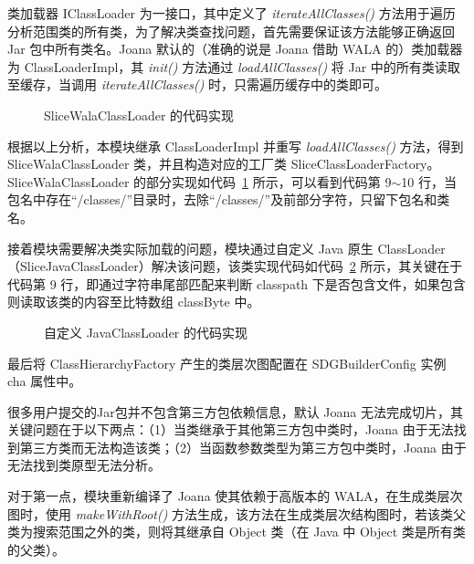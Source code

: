 类加载器 IClassLoader 为一接口，其中定义了 \textit{iterateAllClasses()} 方法用于遍历分析范围类的所有类，为了解决类查找问题，首先需要保证该方法能够正确返回 Jar 包中所有类名。Joana 默认的（准确的说是 Joana 借助 WALA 的）类加载器为 ClassLoaderImpl，其 \textit{init()} 方法通过 \textit{loadAllClasses()} 将 Jar 中的所有类读取至缓存，当调用 \textit{iterateAllClasses()} 时，只需遍历缓存中的类即可。

\begin{figure}[htbp]
    \centering
    \begin{minipage}{0.9\textwidth}
        
    \end{minipage}
    \caption{SliceWalaClassLoader 的代码实现}\label{code:sliceWalaClassLoader}
    \vspace{-0.5cm}
\end{figure}

根据以上分析，本模块继承 ClassLoaderImpl 并重写 \textit{loadAllClasses()} 方法，得到 SliceWalaClassLoader 类，并且构造对应的工厂类 SliceClassLoaderFactory。SliceWalaClassLoader 的部分实现如代码~\ref{code:sliceWalaClassLoader} 所示，可以看到代码第 9$\sim$10 行，当包名中存在“/classes/”目录时，去除“/classes/”及前部分字符，只留下包名和类名。


接着模块需要解决类实际加载的问题，模块通过自定义 Java 原生 ClassLoader（SliceJavaClassLoader）解决该问题，该类实现代码如代码~\ref{code:sliceJavaClassLoader} 所示，其关键在于代码第 9 行，即通过字符串尾部匹配来判断 classpath 下是否包含文件，如果包含则读取该类的内容至比特数组 classByte 中。 

\begin{figure}[htbp]
    \centering
    \begin{minipage}{0.9\textwidth}
        
    \end{minipage}
    \caption{自定义 JavaClassLoader 的代码实现}\label{code:sliceJavaClassLoader}
\end{figure}

最后将 ClassHierarchyFactory 产生的类层次图配置在 SDGBuilderConfig 实例 cha 属性中。

很多用户提交的Jar包并不包含第三方包依赖信息，默认 Joana 无法完成切片，其关键问题在于以下两点：（1）当类继承于其他第三方包中类时，Joana 由于无法找到第三方类而无法构造该类；（2）当函数参数类型为第三方包中类时，Joana 由于无法找到类原型无法分析。

对于第一点，模块重新编译了 Joana 使其依赖于高版本的 WALA，在生成类层次图时，使用 \textit{makeWithRoot()} 方法生成，该方法在生成类层次结构图时，若该类父类为搜索范围之外的类，则将其继承自 Object 类（在 Java 中 Object 类是所有类的父类）。

